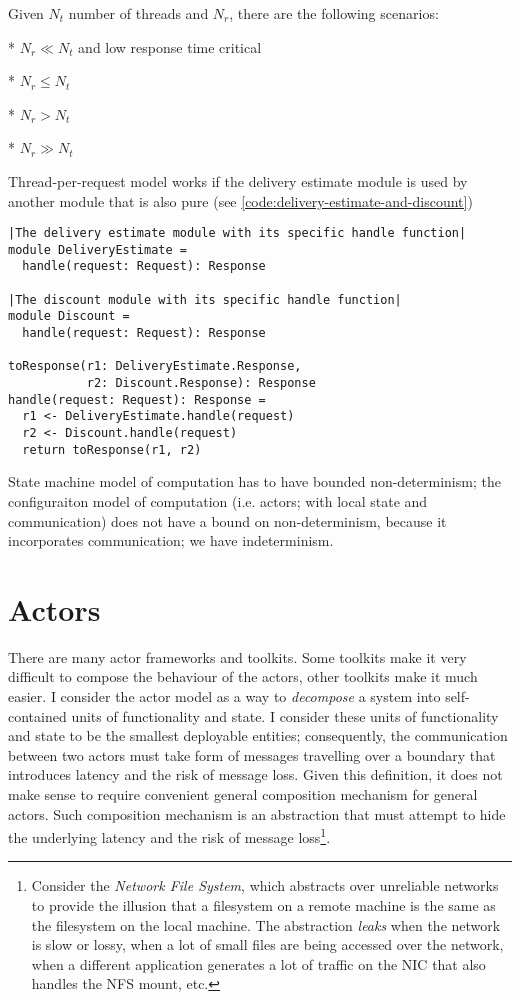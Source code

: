 Given $N_{t}$ number of threads and $N_{r}$, there are the following scenarios:

* $N_{r} \ll N_{t}$ and low response time critical

* $N_{r} \le N_{t}$ 

* $N_{r} > N_{t}$

* $N_{r} \gg N_{t}$

Thread-per-request model works if the delivery estimate module is used by another module that is also pure (see \autoref{code:delivery-estimate-and-discount})

\begin{lstlisting}[caption={Delivery and discount}, label={code:delivery-estimate-and-discount}, language=Pseudo, escapechar=|]
|The delivery estimate module with its specific handle function|
module DeliveryEstimate =
  handle(request: Request): Response

|The discount module with its specific handle function|
module Discount =
  handle(request: Request): Response

toResponse(r1: DeliveryEstimate.Response,
           r2: Discount.Response): Response
handle(request: Request): Response = 
  r1 <- DeliveryEstimate.handle(request)
  r2 <- Discount.handle(request)
  return toResponse(r1, r2)

\end{lstlisting}


State machine model of computation has to have bounded non-determinism; the configuraiton model of computation (i.e. actors; with local state and communication) does not have a bound on non-determinism, because it incorporates communication; we have indeterminism.


\section{Actors}
There are many actor frameworks and toolkits\cite{akka,scalaz8,transient,thespian}. Some toolkits make it very difficult to compose the behaviour of the actors\cite{akka,thespian}, other toolkits make it much easier\cite{scalaz8,transient}. I consider the actor model as a way to \emph{decompose} a system into self-contained units of functionality and state. I consider these units of functionality and state to be the smallest deployable entities; consequently, the communication between two actors must take form of messages travelling over a boundary that introduces latency and the risk of message loss. Given this definition, it does not make sense to require convenient general composition mechanism for general actors. Such composition mechanism is an abstraction that must attempt to hide the underlying latency and the risk of message loss\footnote{Consider the \emph{Network File System}, which abstracts over unreliable networks to provide the illusion that a filesystem on a remote machine is the same as the filesystem on the local machine. The abstraction \emph{leaks} when the network is slow or lossy, when a lot of small files are being accessed over the network, when a different application generates a lot of traffic on the NIC that also handles the NFS mount, etc.}. 


\printbibliography

